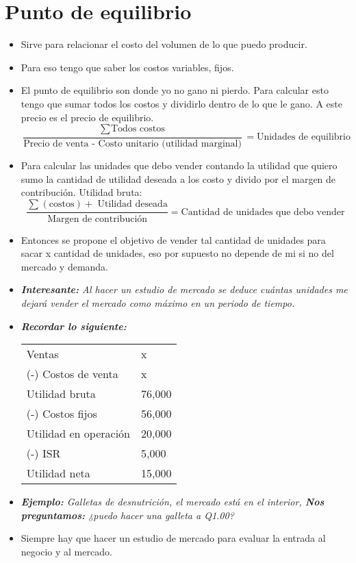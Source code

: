 \section{Punto de equilibrio}
\begin{itemize}
    \item Sirve para relacionar el costo del volumen de lo que puedo producir.
    \item Para eso tengo que saber los costos variables, fijos.
    \item El punto de equilibrio son donde yo no gano ni pierdo. Para calcular esto tengo que sumar todos los costos y dividirlo dentro de lo que le gano. A este precio es el precio de equilibrio.
        \[
          \frac{\sum_{}^{}\text{Todos costos}}{\text{Precio de venta - Costo unitario (utilidad marginal)}} = \text{Unidades de equilibrio }
        \]
        
    \item Para calcular las unidades que debo vender contando la utilidad que quiero sumo la cantidad de utilidad deseada a los costo y divido por el margen de contribución. Utilidad bruta: 
        \[
        \frac{\sum_{}^{}(\text{costos}) + \text{ Utilidad deseada} }{\text{Margen de contribución}} = \text{Cantidad de unidades que debo vender}
        \]
    
    \item Entonces se propone el objetivo de vender tal cantidad de unidades para sacar x cantidad de unidades, eso por supuesto no depende de mi si no del mercado y demanda.
    \item \emph{\textbf{Interesante:} Al hacer un estudio de mercado se deduce cuántas unidades me dejará vender el mercado como máximo en un periodo de tiempo.}
    \item \emph{\textbf{Recordar lo siguiente: }}
        \begin{center}
           \begin{tabular}{ | p{5cm} | p{5cm} | }
               \hline
                    Ventas & x    \\
                    (-) Costos de venta & x \\ 
               \hline
                    Utilidad bruta & 76,000 \\ 
                    (-) Costos fijos & 56,000 \\ 
                \hline
                    Utilidad en operación & 20,000 \\ 
                    (-) ISR & 5,000 \\ 
                    Utilidad neta & 15,000 \\ 
                \hline
           \end{tabular}
        \end{center}
    
    \item \emph{\textbf{Ejemplo: }Galletas de desnutrición, el mercado está en el interior, \textbf{Nos preguntamos:} ¿puedo hacer una galleta a Q1.00?}
    \item Siempre hay que hacer un estudio de mercado para evaluar la entrada al negocio y al mercado.
\end{itemize}

